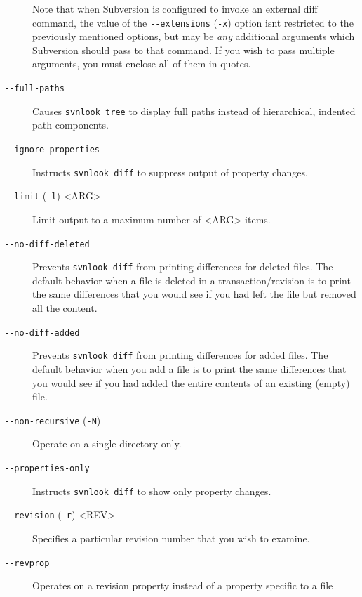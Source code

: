 \begin{description}
Note that when Subversion is configured to invoke an external diff
command, the value of the \texttt{-\/-extensions} (\texttt{-x}) option
isn\textquotesingle t restricted to the previously mentioned options,
but may be \emph{any} additional arguments which Subversion should pass
to that command. If you wish to pass multiple arguments, you must
enclose all of them in quotes.
\item[\protect\phantomsection\label{svn.ref.svnlook.sw.full_paths}{}\texttt{-\/-full-paths}]
Causes \texttt{svnlook\ tree} to display full paths instead of
hierarchical, indented path components.
\item[\protect\phantomsection\label{svn.ref.svnlook.sw.ignore_properties}{}\texttt{-\/-ignore-properties}]
Instructs \texttt{svnlook\ diff} to suppress output of property changes.
\item[\protect\phantomsection\label{svn.ref.svnlook.sw.limit}{}\texttt{-\/-limit}
(\texttt{-l}) \textless ARG\textgreater{}]
Limit output to a maximum number of \textless ARG\textgreater{} items.
\item[\protect\phantomsection\label{svn.ref.svnlook.sw.no_diff_deleted}{}\texttt{-\/-no-diff-deleted}]
Prevents \texttt{svnlook\ diff} from printing differences for deleted
files. The default behavior when a file is deleted in a
transaction/revision is to print the same differences that you would see
if you had left the file but removed all the content.
\item[\protect\phantomsection\label{svn.ref.svnlook.sw.no_diff_added}{}\texttt{-\/-no-diff-added}]
Prevents \texttt{svnlook\ diff} from printing differences for added
files. The default behavior when you add a file is to print the same
differences that you would see if you had added the entire contents of
an existing (empty) file.
\item[\protect\phantomsection\label{svn.ref.svnlook.sw.non_recursive}{}\texttt{-\/-non-recursive}
(\texttt{-N})]
Operate on a single directory only.
\item[\protect\phantomsection\label{svn.ref.svnlook.sw.properties_only}{}\texttt{-\/-properties-only}]
Instructs \texttt{svnlook\ diff} to show only property changes.
\item[\protect\phantomsection\label{svn.ref.svnlook.sw.revision}{}\texttt{-\/-revision}
(\texttt{-r}) \textless REV\textgreater{}]
Specifies a particular revision number that you wish to examine.
\item[\protect\phantomsection\label{svn.ref.svnlook.sw.revprop}{}\texttt{-\/-revprop}]
Operates on a revision property instead of a property specific to a file

\end{description}
